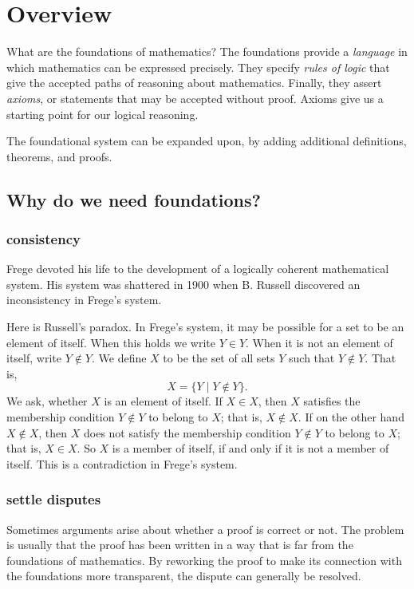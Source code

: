 
\chapter{Overview} 

   What are the foundations of mathematics?  The foundations provide a {\it language} in which mathematics can be expressed precisely.  They specify {\it rules of logic} that give the accepted paths of reasoning about mathematics.  Finally, they assert {\it axioms}, or statements that may be accepted without proof.  Axioms give us a starting point for our logical reasoning.

  The foundational system can be expanded upon, by adding additional definitions, theorems, and proofs.

\section{Why do we need foundations?}

\subsection{consistency}

Frege devoted his life to the development of a logically coherent mathematical system.  His system was shattered in 1900 when B. Russell discovered an inconsistency in Frege's system.  

Here is Russell's paradox.  In Frege's system, it may be possible for a set to be an element of itself.  When this holds we write $Y\in Y$.  When it is not an element of itself, write $Y\not\in Y$.   We define $X$ to be the set of all sets $Y$ such that $Y\not\in Y$.  That is,
    $$X = \{Y\mid Y\not\in Y\}.$$
We ask, whether $X$ is an element of itself.    If $X\in X$, then $X$ satisfies the membership condition $Y\not\in Y$ to belong to $X$;  that is, $X\not\in X$.
If on the other hand $X\not\in X$, then $X$ does not satisfy the membership condition $Y\not\in Y$ to belong to $X$; that is, $X\in X$.  So $X$ is a member of itself, if and only if it is not a member of itself.  This is a contradiction in Frege's system.

\subsection{settle disputes}

Sometimes arguments arise about whether a proof is correct or not.  The problem is usually that the proof has been written in a way that is far from the foundations of mathematics.  By reworking the proof to make its connection with the foundations more transparent, the dispute can generally be resolved.


